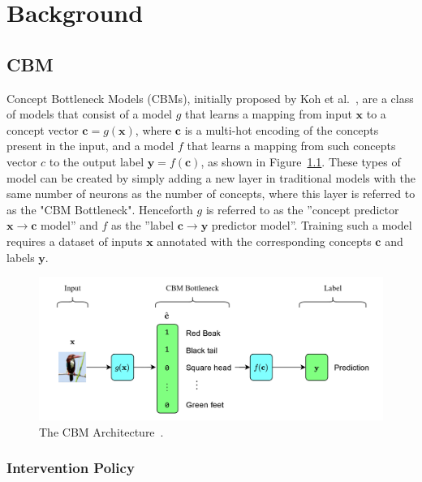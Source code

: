 \documentclass[../main.tex]{subfiles}
\begin{document}
\chapter{Background}

\section{CBM}\label{background:cbm}

Concept Bottleneck Models (CBMs), initially proposed by Koh et al.~\cite{cbm}, are a class of models
that consist of a model $g$ that learns a mapping from
input $\mathbf{x}$ to a concept vector $\mathbf{c} = g(\mathbf{x})$, 
where $\mathbf{c}$ is a multi-hot encoding of the concepts present in the input,
and a model $f$
that learns a mapping from such concepts vector $c$
to the output label $\mathbf{y} = f(\mathbf{c})$, as shown in Figure~\ref{fig:cbm}.
These types of model can be created by simply adding a new layer in traditional models
with the same number of neurons as the number of concepts, where this layer
is referred to as the "CBM Bottleneck". 
Henceforth $g$ is referred to as the ''concept predictor $\mathbf{x} \to \mathbf{c}$ model'' and $f$ as the
''label $\mathbf{c} \to \mathbf{y}$ predictor model''.
 Training such a model requires a
dataset of inputs $\mathbf{x}$ annotated with the corresponding 
concepts $\mathbf{c}$ and labels $\mathbf{y}$. 

\begin{figure}[!h]
    \centering
    \includegraphics[width=\textwidth]{figs/background/cbm.png}
    \caption{The CBM Architecture~\cite{cbm}.}
    \label{fig:cbm}
\end{figure}

\subsection{Intervention Policy}
\end{document}

